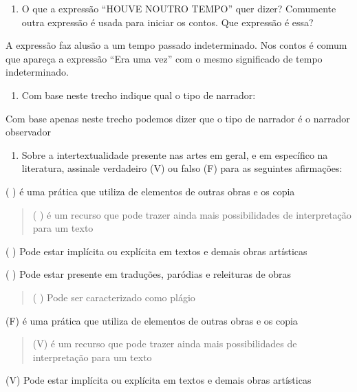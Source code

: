 {\begin{enumerate}
\def\labelenumi{\arabic{enumi})}
\setcounter{enumi}{5}
\tightlist
\item
  O que a expressão ``HOUVE NOUTRO TEMPO'' quer dizer? Comumente outra
  expressão é usada para iniciar os contos. Que expressão é essa?
\end{enumerate}

A expressão faz alusão a um tempo passado indeterminado. Nos contos é
comum que apareça a expressão ``Era uma vez'' com o mesmo significado de
tempo indeterminado.

\begin{enumerate}
\def\labelenumi{\arabic{enumi})}
\setcounter{enumi}{6}
\tightlist
\item
  Com base neste trecho indique qual o tipo de narrador:
\end{enumerate}

Com base apenas neste trecho podemos dizer que o tipo de narrador é o
narrador observador

\begin{enumerate}
\def\labelenumi{\arabic{enumi})}
\setcounter{enumi}{7}
\tightlist
\item
  Sobre a intertextualidade presente nas artes em geral, e em específico
  na literatura, assinale verdadeiro (V) ou falso (F) para as seguintes
  afirmações:
\end{enumerate}

( ) é uma prática que utiliza de elementos de outras obras e os copia

\begin{quote}
( ) é um recurso que pode trazer ainda mais possibilidades de
interpretação para um texto
\end{quote}

( ) Pode estar implícita ou explícita em textos e demais obras
artísticas

( ) Pode estar presente em traduções, paródias e releituras de obras

\begin{quote}
( ) Pode ser caracterizado como plágio
\end{quote}

(F) é uma prática que utiliza de elementos de outras obras e os copia

\begin{quote}
(V) é um recurso que pode trazer ainda mais possibilidades de
interpretação para um texto
\end{quote}

(V) Pode estar implícita ou explícita em textos e demais obras
artísticas

}
